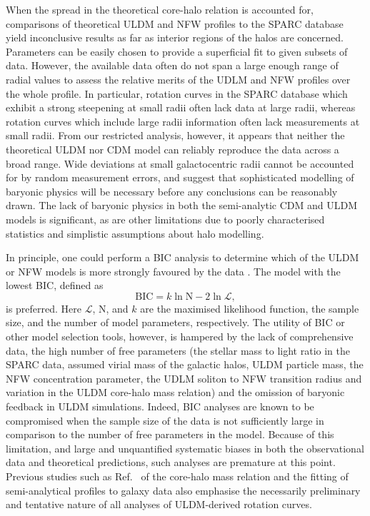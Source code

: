 \documentclass{pasa}%
\begin{document}
When the spread in the theoretical core-halo relation is accounted for, comparisons of theoretical ULDM and NFW profiles to the SPARC database yield inconclusive results as far as interior regions of the halos are concerned. Parameters can be easily chosen to provide a superficial fit to given subsets of data. However, the available data often do not span a large enough range of radial values to assess the relative merits of the UDLM and NFW profiles over the whole profile. In particular, rotation curves in the SPARC database which exhibit a strong steepening at small radii often lack data at large radii, whereas rotation curves which include large radii information often lack measurements at small radii. From our restricted analysis, however, it appears that neither the theoretical ULDM nor CDM model can reliably reproduce the data across a broad range. Wide deviations at small galactocentric radii cannot be accounted for by random measurement errors, and suggest that sophisticated modelling of baryonic physics will be necessary before any conclusions can be reasonably drawn. The lack of baryonic physics in both the semi-analytic CDM and ULDM models is significant, as are other limitations due to poorly characterised statistics and simplistic assumptions about halo modelling. 

In principle, one could perform a BIC analysis to determine which of the ULDM or NFW models is more strongly favoured by the data \cite{Liddle:2004nh}. The model with the lowest BIC, defined as
\begin{equation}
    \mathrm{BIC} = k \ln{\mathrm{N}} - 2 \ln{\mathcal{L}},    
\end{equation}
is preferred. Here $\mathcal{L}$, $\mathrm{N}$, and $k$ are the maximised likelihood function, the sample size, and the number of model parameters, respectively. The utility of BIC or other model selection tools, however, is hampered by the lack of comprehensive data, the high number of free parameters (the stellar mass to light ratio in the SPARC data, assumed virial mass of the galactic halos,  ULDM particle mass, the NFW concentration parameter, the UDLM soliton to NFW transition radius and  variation in the ULDM core-halo mass relation) and the omission of baryonic feedback in ULDM simulations. Indeed, BIC analyses are known to be compromised when the sample size of the data is not sufficiently large in comparison to the number of free parameters in the model. Because of this limitation, and large and unquantified systematic biases in both the observational data and theoretical predictions, such analyses are premature at this point. Previous studies such as Ref.~\cite{Bar2018acw} of the core-halo mass relation and the fitting of semi-analytical profiles to galaxy data also emphasise the necessarily preliminary and tentative nature of all analyses of ULDM-derived rotation curves. 
\end{document}
